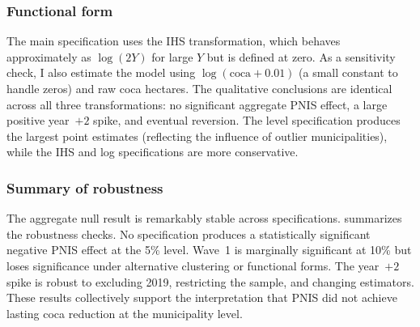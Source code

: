 \documentclass[12pt]{article}
\begin{document}
\subsubsection*{Functional form} The main specification uses the IHS transformation, which behaves approximately as $\log(2Y)$ for large $Y$ but is defined at zero. As a sensitivity check, I also estimate the model using $\log(\text{coca} + 0.01)$ (a small constant to handle zeros) and raw coca hectares. The qualitative conclusions are identical across all three transformations: no significant aggregate PNIS effect, a large positive year~$+2$ spike, and eventual reversion. The level specification produces the largest point estimates (reflecting the influence of outlier municipalities), while the IHS and log specifications are more conservative.

\subsubsection*{Summary of robustness} The aggregate null result is remarkably stable across specifications.  summarizes the robustness checks. No specification produces a statistically significant negative PNIS effect at the 5\% level. Wave~1 is marginally significant at 10\% but loses significance under alternative clustering or functional forms. The year~$+2$ spike is robust to excluding 2019, restricting the sample, and changing estimators. These results collectively support the interpretation that PNIS did not achieve lasting coca reduction at the municipality level.
\end{document}
